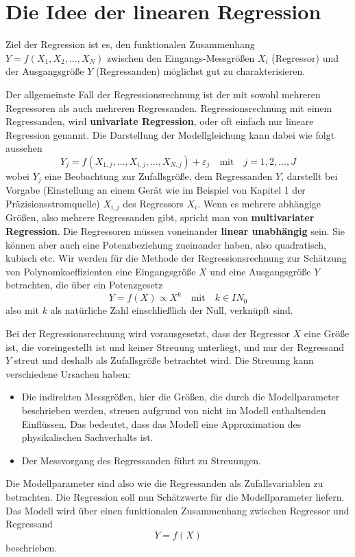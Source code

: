 
\section{Die Idee der linearen Regression}
\label{RegressionsIdee}
Ziel der Regression ist es, den funktionalen Zusammenhang $Y =
f(X_{1} ,X_{2} ,...,X_{N} )$ zwischen den
Eingangs-Messgrößen $X_{i}$ (Regressor) und der Ausgangsgröße $Y$
(Regressanden) möglichst gut zu charakterisieren.

Der allgemeinste Fall der Regressionsrechnung ist der mit sowohl mehreren
Regressoren als auch mehreren Regressanden.
Regressionsrechnung mit einem Regressanden, wird \textbf{univariate Regression}, oder oft einfach nur lineare Regression genannt.
Die Darstellung der Modellgleichung kann dabei wie folgt aussehen
\begin{equation}
Y_j = f(X_{1,j},\dots, X_{i,j},\dots, X_{N,j}) + \varepsilon_j \quad \mathrm{mit} \quad j = 1,2,\ldots,J
\label{Kap2Modellglunivar}
\end{equation}
wobei $Y_j$ eine Beobachtung zur Zufallsgröße, dem Regressanden $Y$, darstellt bei Vorgabe (Einstellung an einem
Gerät wie im Beispiel von Kapitel 1 der Präzisionsstromquelle) $X_{i,j}$ des Regressors $X_i$.
Wenn es mehrere abhängige Größen, also mehrere Regressanden gibt, spricht man von \textbf{multivariater Regression}. Die Regressoren müssen voneinander \textbf{linear unabhängig} sein.
Sie können aber auch eine Potenzbeziehung zueinander haben, also quadratisch, kubisch etc.
Wir werden für die Methode der Regressionsrechnung zur Schätzung von Polynomkoeffizienten
eine Eingangsgröße $X$ und eine Ausgangsgröße $Y$ betrachten, die über ein Potenzgesetz
\begin{equation}
Y = f(X) \propto X^k \quad \mathrm{mit} \quad k \in I \! \! N_0
\label{potenzgesetzlinReg}
\end{equation}
also mit $k$ als natürliche Zahl einschließlich der Null, verknüpft sind.

Bei der Regressionsrechnung wird vorausgesetzt,
dass der Regressor $X$ eine Größe ist, die voreingestellt ist und keiner Streuung unterliegt,
und nur der Regressand $Y$ streut und deshalb als Zufallsgröße betrachtet wird.
Die Streuung kann verschiedene Ursachen haben:
\begin{itemize}
\item Die indirekten Messgrößen, hier die Größen, die durch die
Modellparameter beschrieben werden, streuen aufgrund von nicht im Modell
enthaltenden Einflüssen.
Das bedeutet, dass das Modell eine Approximation des physikalischen Sachverhalts ist.
\item Der Messvorgang des Regressanden führt zu Streuungen.
\end{itemize}
Die Modellparameter sind also wie die Regressanden als Zufallsvariablen
zu betrachten. Die Regression soll nun Schätzwerte für die
Modellparameter liefern. Das Modell wird über einen
funktionalen Zusammenhang zwischen Regressor und Regressand
\begin{equation}
Y = f(X)
\label{Kap2Modellgleichung}
\end{equation}
beschrieben.

